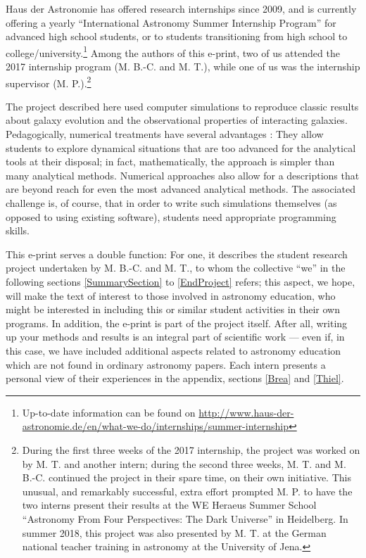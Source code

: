 \documentclass[11pt,twocolumn]{article}
\begin{document}
Haus der Astronomie has offered research internships since 2009, and is currently offering a yearly ``International Astronomy Summer Internship Program'' for advanced high school students, or to students transitioning from high school to college/university.\footnote{Up-to-date information can be found on 
\href{http://www.haus-der-astronomie.de/en/what-we-do/internships/summer-internship}{http://www.haus-der-astronomie.de/en/what-we-do/internships/summer-internship} } Among the authors of this e-print, two of us attended the 2017 internship program (M. B.-C. and M. T.), while one of us was the internship supervisor (M. P.).\footnote{During the first three weeks of the 2017 internship, the project was worked on by M. T. and another intern; during the second three weeks, M. T. and M. B.-C. continued the project in their spare time, on their own initiative. This unusual, and remarkably successful, extra effort prompted M. P. to have the two interns present their results at the WE Heraeus Summer School ``Astronomy From Four Perspectives: The Dark Universe'' in Heidelberg. In summer 2018, this project was also presented by M. T. at the German national teacher training in astronomy at the University of Jena.} 

The project described here used computer simulations to reproduce classic results about galaxy evolution and the observational properties of interacting galaxies. Pedagogically, numerical treatments have several advantages \cite{FeynmanLectures,1978AmJPh..46..748C,1984AmJPh..52..499S}: They allow students to explore dynamical situations that are too advanced for the analytical tools at their disposal; in fact, mathematically, the approach is simpler than many analytical methods. Numerical approaches also allow for a descriptions that are beyond reach for even the most advanced analytical methods. The associated challenge is, of course, that in order to write such simulations themselves (as opposed to using existing software), students need appropriate programming skills.

This e-print serves a double function: For one, it describes the student research project undertaken by M. B.-C. and M. T., to whom the collective ``we'' in the following sections \ref{SummarySection} to \ref{EndProject} refers; this aspect, we hope, will make the text of interest to those involved in astronomy education,
who might be interested in including this or similar student activities in their own programs. In addition, the e-print is part of the project itself. After all, writing up your methods and results is an integral part of scientific work --- even if, in this case, we have included additional aspects related to astronomy education which are not found in ordinary astronomy papers. Each intern presents a personal view of their experiences in the appendix, sections \ref{Brea} and \ref{Thiel}. 
\end{document}
